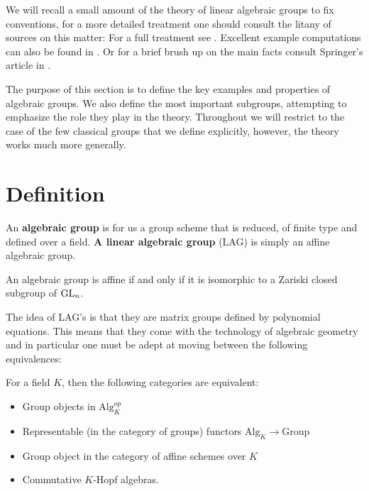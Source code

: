 We will recall a small amount of the theory of linear algebraic groups to fix conventions, for a more detailed treatment one should consult the litany of sources on this matter: For a full treatment see \cite{milneAlgebraicGroupsTheory2017}\cite{milneLieAlgebrasAlgebraic}\cite{milneBasicTheoryAffine2012}\cite{springerLinearAlgebraicGroups1998}. Excellent example computations can also be found in \cite{garrettBuildingsClassicalGroups1997}\cite{makisumiStructureTheoryReductive}\cite{malleLinearAlgebraicGroups2011}. Or for a brief brush up on the main facts consult Springer's article in  \cite[Part 1, ``Reductive Groups'']{borelAutomorphicFormsRepresentations1979}. 

The purpose of this section is to define the key examples and properties of algebraic groups. We also define the most important subgroups, attempting to emphasize the role they play in the theory. 
Throughout we will restrict to the case of the few classical groups that we define explicitly, however, the theory works much more generally. 

\section{Definition}
An \textbf{algebraic group} is for us a group scheme that is reduced, of finite type and defined over a field. \textbf{A linear algebraic group} (LAG) is simply an affine algebraic group.

\begin{proposition}
    An algebraic group is affine if and only if it is isomorphic to a Zariski closed subgroup of \(\operatorname{GL}_n\).
\end{proposition}

The idea of LAG's is that they are matrix groups defined by polynomial equations. This means that they come with the technology of algebraic geometry and in particular one must be adept at moving between the following equivalences:
\begin{Theorem}
    For a field \(K\), then the following categories are equivalent:
    \begin{itemize}
        \item Group objects in \(\mathrm{Alg}_K^{op}\)
        \item Representable (in the category of groups) functors \(\mathrm{Alg}_K \to \mathrm{Group}\)
        \item Group object in the category of affine schemes over \(K\)
        \item Commutative \(K\)-Hopf algebras.
    \end{itemize}
\end{Theorem}

